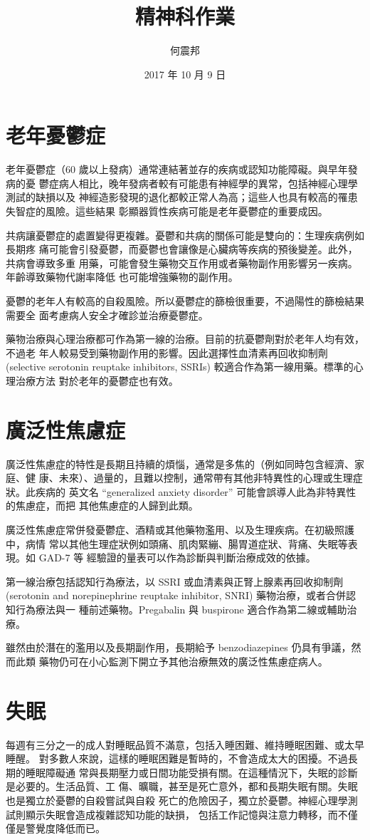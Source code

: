 \documentclass[a4paper, 12pt]{article}
\title{精神科作業}
\author{何震邦}
\date{2017 年 10 月 9 日}
\begin{document}
\maketitle
\section{老年憂鬱症}
老年憂鬱症（60 歲以上發病）通常連結著並存的疾病或認知功能障礙。與早年發病的憂
鬱症病人相比，晚年發病者較有可能患有神經學的異常，包括神經心理學測試的缺損以及
神經造影發現的退化都較正常人為高；這些人也具有較高的罹患失智症的風險。這些結果
彰顯器質性疾病可能是老年憂鬱症的重要成因。

共病讓憂鬱症的處置變得更複雜。憂鬱和共病的關係可能是雙向的：生理疾病例如長期疼
痛可能會引發憂鬱，而憂鬱也會讓像是心臟病等疾病的預後變差。此外，共病會導致多重
用藥，可能會發生藥物交互作用或者藥物副作用影響另一疾病。年齡導致藥物代謝率降低
也可能增強藥物的副作用。

憂鬱的老年人有較高的自殺風險。所以憂鬱症的篩檢很重要，不過陽性的篩檢結果需要全
面考慮病人安全才確診並治療憂鬱症。

藥物治療與心理治療都可作為第一線的治療。目前的抗憂鬱劑對於老年人均有效，不過老
年人較易受到藥物副作用的影響。因此選擇性血清素再回收抑制劑 (selective
serotonin reuptake inhibitors, SSRIs) 較適合作為第一線用藥。標準的心理治療方法
對於老年的憂鬱症也有效。

\section{廣泛性焦慮症}
廣泛性焦慮症的特性是長期且持續的煩惱，通常是多焦的（例如同時包含經濟、家庭、健
康、未來）、過量的，且難以控制，通常帶有其他非特異性的心理或生理症狀。此疾病的
英文名 ``generalized anxiety disorder'' 可能會誤導人此為非特異性的焦慮症，而把
其他焦慮症的人歸到此類。

廣泛性焦慮症常併發憂鬱症、酒精或其他藥物濫用、以及生理疾病。在初級照護中，病情
常以其他生理症狀例如頭痛、肌肉緊繃、腸胃道症狀、背痛、失眠等表現。如 GAD-7 等
經驗證的量表可以作為診斷與判斷治療成效的依據。

第一線治療包括認知行為療法，以 SSRI 或血清素與正腎上腺素再回收抑制劑 (serotonin
and norepinephrine reuptake inhibitor, SNRI) 藥物治療，或者合併認知行為療法與一
種前述藥物。Pregabalin 與 buspirone 適合作為第二線或輔助治療。

雖然由於潛在的濫用以及長期副作用，長期給予 benzodiazepines 仍具有爭議，然而此類
藥物仍可在小心監測下開立予其他治療無效的廣泛性焦慮症病人。

\section{失眠}
每週有三分之一的成人對睡眠品質不滿意，包括入睡困難、維持睡眠困難、或太早睡醒。
對多數人來說，這樣的睡眠困難是暫時的，不會造成太大的困擾。不過長期的睡眠障礙通
常與長期壓力或日間功能受損有關。在這種情況下，失眠的診斷是必要的。生活品質、工
傷、曠職，甚至是死亡意外，都和長期失眠有關。失眠也是獨立於憂鬱的自殺嘗試與自殺
死亡的危險因子，獨立於憂鬱。神經心理學測試則顯示失眠會造成複雜認知功能的缺損，
包括工作記憶與注意力轉移，而不僅僅是警覺度降低而已。
\end{document}

